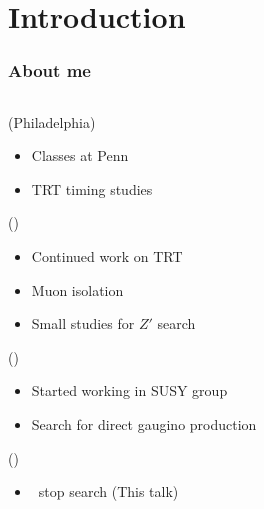 \documentclass[10pt, svgnames]{beamer}
\begin{document}
\section{Introduction}

\begin{frame}
  \frametitle{About me}
  \begin{columns}
    \begin{description}[0ex]
      \item[2008-2010] (Philadelphia) \\
        \begin{itemize}
          \item Classes at Penn
          \item TRT timing studies
        \end{itemize}
      \item[2010-2012] (\cern) \\
        \begin{itemize}
          \item Continued work on TRT
          \item Muon isolation
          \item Small studies for $Z'$ search
        \end{itemize}
      \item[2012-2013] (\cern) \\
        \begin{itemize}
          \item Started working in SUSY group
          \item Search for direct gaugino production
        \end{itemize}
      \item[2013-2015] (\cern) \\
        \begin{itemize}
          \item \BMINUSL\ stop search (This talk)
        \end{itemize}
    \end{description}

\end{columns}
\end{frame}
\end{document}
